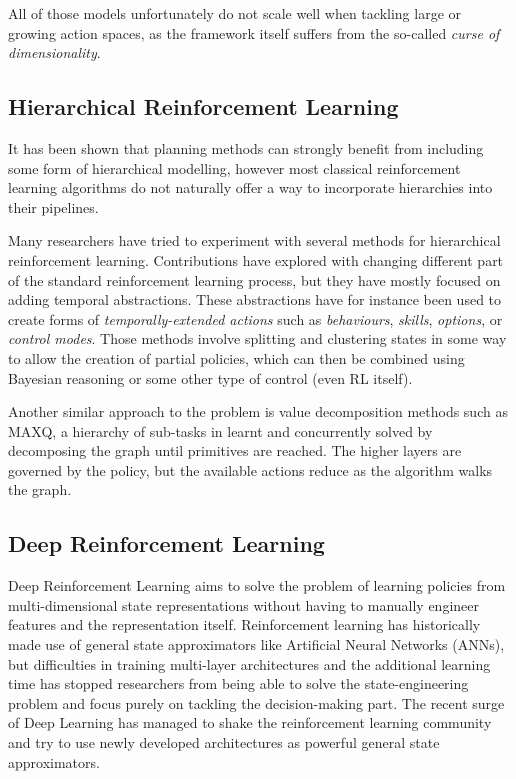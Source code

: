 All of those models unfortunately do not scale well when tackling large or
growing action spaces, as the framework itself suffers from the so-called
\emph{curse of dimensionality}. 

\subsection{Hierarchical Reinforcement Learning}

It has been shown that planning methods can
strongly benefit from including some form of hierarchical modelling, however
most classical reinforcement learning algorithms do not naturally offer a way to
incorporate hierarchies into their pipelines.

Many researchers have tried to experiment with several methods for hierarchical
reinforcement learning. Contributions have explored with changing different part
of the standard reinforcement learning process, but they have mostly focused on
adding temporal abstractions. These abstractions have for instance been used to
create forms of \emph{temporally-extended actions} such as 
\emph{behaviours},
\emph{skills}, 
\emph{options}, 
or \emph{control modes}.
Those methods involve splitting and clustering states in some way to allow
the creation of partial policies, which can then be combined using Bayesian
reasoning or some other type of control (even RL itself).


Another similar approach to the problem is value decomposition methods such as
MAXQ, a hierarchy of sub-tasks in learnt and concurrently solved by decomposing
the graph until primitives are reached. The higher layers are governed by the
policy, but the available actions reduce as the algorithm walks the graph.


\subsection{Deep Reinforcement Learning}

Deep Reinforcement Learning aims to solve the problem of learning policies from
multi-dimensional state representations without having to manually engineer
features and the representation itself. Reinforcement learning has historically
made use of general state approximators like Artificial Neural Networks (ANNs),
but difficulties in training multi-layer architectures and the additional
learning time has stopped researchers from being able to solve the
state-engineering problem and focus purely on tackling the decision-making part.
The recent surge of Deep Learning has managed to shake the reinforcement
learning community and try to use newly developed architectures as powerful
general state approximators.

